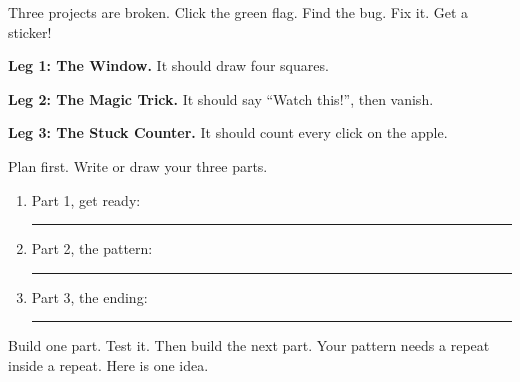 \begin{exercise}
Three projects are broken. Click the green flag. Find the bug. Fix it. Get a sticker!

\textbf{Leg 1: The Window.} It should draw four squares.
\begin{center}
\begin{scratch}[scale=0.8]
\end{scratch}
\end{center}

\textbf{Leg 2: The Magic Trick.} It should say \enquote{Watch this!}, then vanish.
\begin{center}
\begin{scratch}[scale=0.8]
\end{scratch}
\qquad
\begin{scratch}[scale=0.8]
\end{scratch}
\end{center}

\textbf{Leg 3: The Stuck Counter.} It should count every click on the apple.
\begin{center}
\begin{scratch}[scale=0.8]
\end{scratch}
\end{center}
\end{exercise}

\begin{exercise}
Plan first. Write or draw your three parts.
\begin{enumerate}[leftmargin=1.4em,itemsep=2pt]
  \item Part 1, get ready: \rule{6cm}{0.4pt}
  \item Part 2, the pattern: \rule{6cm}{0.4pt}
  \item Part 3, the ending: \rule{6cm}{0.4pt}
\end{enumerate}
Build one part. Test it. Then build the next part. Your pattern needs a repeat inside a repeat. Here is one idea.
\begin{center}
\begin{scratch}[scale=0.8]
\end{scratch}
\end{center}
\end{exercise}

